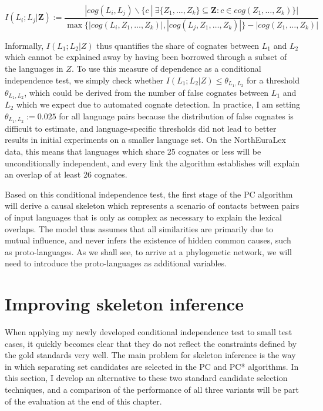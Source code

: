 \begin{equation}
 I(L_i;L_j|\mathbf{Z}) := \frac{|cog(L_i,L_j)\backslash\{c\ |\ \exists \{Z_1,\dots,Z_k\} \subseteq \mathbf{Z}\colon c \in cog(Z_1,\dots,Z_k)\}|}{\max\{|cog(L_i,Z_1,\dots,Z_k)|,|cog(L_j,Z_1,\dots,Z_k)|\}-|cog(Z_1,\dots,Z_k)|} 
\end{equation}

Informally, $I(L_1;L_2|Z)$ thus quantifies the share of cognates between $L_1$ and $L_2$ which cannot be explained away by having been borrowed through a subset of the languages in $Z$. To use this measure of dependence as a conditional independence test, we simply check whether $I(L_1;L_2|Z) \leq \theta_{L_1,L_2}$ for a threshold $\theta_{L_1,L_2}$, which could be derived from the number of false cognates between $L_1$ and $L_2$ which we expect due to automated cognate detection. In practice, I am setting $\theta_{L_1,L_2} := 0.025$ for all language pairs because the distribution of false cognates is difficult to estimate, and language-specific thresholds did not lead to better results in initial experiments on a smaller language set. On the NorthEuraLex data, this means that languages which share 25 cognates or less will be unconditionally independent, and every link the algorithm establishes will explain an overlap of at least 26 cognates.

Based on this conditional independence test, the first stage of the PC algorithm will derive a causal skeleton which represents a scenario of contacts between pairs of input languages that is only as complex as necessary to explain the lexical overlaps. The model thus assumes that all similarities are primarily due to mutual influence, and never infers the existence of hidden common causes, such as proto-languages. As we shall see, to arrive at a phylogenetic network, we will need to introduce the proto-languages as additional variables.

\section{Improving skeleton inference}\label{sec:6.4}
When applying my newly developed conditional independence test to small test cases, it quickly becomes clear that they do not reflect the constraints defined by the gold standards very well. The main problem for skeleton inference is the way in which separating set candidates are selected in the PC and PC* algorithms. In this section, I develop an alternative to these two standard candidate selection techniques, and a comparison of the performance of all three variants will be part of the evaluation at the end of this chapter.

